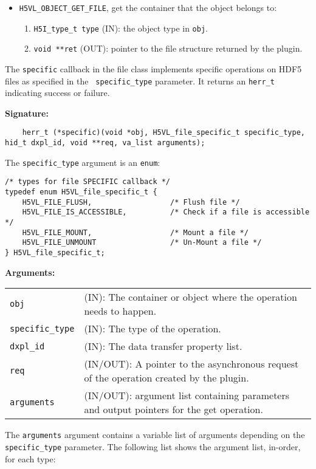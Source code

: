 \begin{itemize}
\item {\tt H5VL\_OBJECT\_GET\_FILE}, get the container that the object
  belongs to:
  \begin{enumerate}
  \item {\tt H5I\_type\_t type} (IN): the object type in {\tt obj}.
  \item {\tt void **ret} (OUT): pointer to the file structure returned
    by the plugin.
  \end{enumerate}
\end{itemize}

The {\tt specific} callback in the file class implements specific operations on HDF5 files as specified in the {\tt
  specific\_type} parameter. It returns an {\tt herr\_t} indicating success or failure.

\textbf{Signature:}
\begin{lstlisting}
    herr_t (*specific)(void *obj, H5VL_file_specific_t specific_type, hid_t dxpl_id, void **req, va_list arguments);
\end{lstlisting}

The {\tt specific\_type} argument is an {\tt enum}:
\begin{lstlisting}
/* types for file SPECIFIC callback */
typedef enum H5VL_file_specific_t {
    H5VL_FILE_FLUSH,                  /* Flush file */
    H5VL_FILE_IS_ACCESSIBLE,          /* Check if a file is accessible */
    H5VL_FILE_MOUNT,                  /* Mount a file */
    H5VL_FILE_UNMOUNT                 /* Un-Mount a file */
} H5VL_file_specific_t;
\end{lstlisting}

\textbf{Arguments:}\\
\begin{tabular}{l p{10cm}}
  {\tt obj} & (IN): The container or object where the operation needs
  to happen.\\
  {\tt specific\_type} & (IN): The type of the operation.\\
  {\tt dxpl\_id} & (IN): The data transfer property list.\\
  {\tt req} & (IN/OUT): A pointer to the asynchronous request of the
  operation created by the plugin.\\
  {\tt arguments} & (IN/OUT): argument list containing parameters and
  output pointers for the get operation. \\
\end{tabular}

The {\tt arguments} argument contains a variable list of arguments
depending on the {\tt specific\_type} parameter. The following list shows
the argument list, in-order, for each type:

